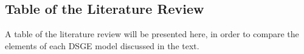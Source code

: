 \documentclass[../thesis.tex]{subfiles}
\begin{document}
\newpage

\subsection{Table of the Literature Review}

A table of the literature review will be presented here, in order to compare the elements of each DSGE model discussed in the text.
\end{document}
